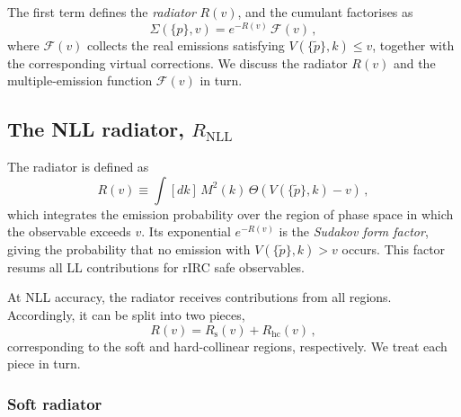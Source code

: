 The first term defines the \emph{radiator} $R(v)$, and the cumulant
factorises as
\begin{equation}
  \label{eq:cumu-factor-combine}
  \Sigma\left(\{p\},v\right)
  = e^{-R(v)}\,\mathcal{F}(v)\,,
\end{equation}
where $\mathcal{F}(v)$ collects the real emissions satisfying
$V(\{\tilde{p}\},k)\leq v$, together with the corresponding virtual
corrections.
We discuss the radiator $R(v)$ and the multiple-emission function
$\mathcal{F}(v)$ in turn.

\subsection{The NLL radiator, $R_{\mathrm{NLL}}$}
\label{subsec:NLL-radiator}

The radiator is defined as
\begin{equation}
\label{eq:radiator-NLL}
R(v) \equiv \int[dk]\,M^2(k)\,\Theta\!\left(V(\{\tilde{p}\},k)-v\right)\,,
\end{equation}
which integrates the emission probability over the region of phase space in which the observable exceeds $v$.
Its exponential $e^{-R(v)}$ is the \emph{Sudakov form factor}, giving the probability that no emission with $V(\{\tilde{p}\},k)>v$ occurs.
This factor resums all LL contributions for rIRC safe observables.

At NLL accuracy, the radiator receives contributions from all regions. 
Accordingly, it can be split into
two pieces,
\begin{equation}
\label{eq:R(v)-split}
R(v)=R_{\mathrm{s}}(v)+R_{\mathrm{hc}}(v)\,,
\end{equation}
corresponding to the soft and hard-collinear regions, respectively.
We treat each piece in turn.

\subsubsection{Soft radiator}
\label{subsubsec:Rs}

